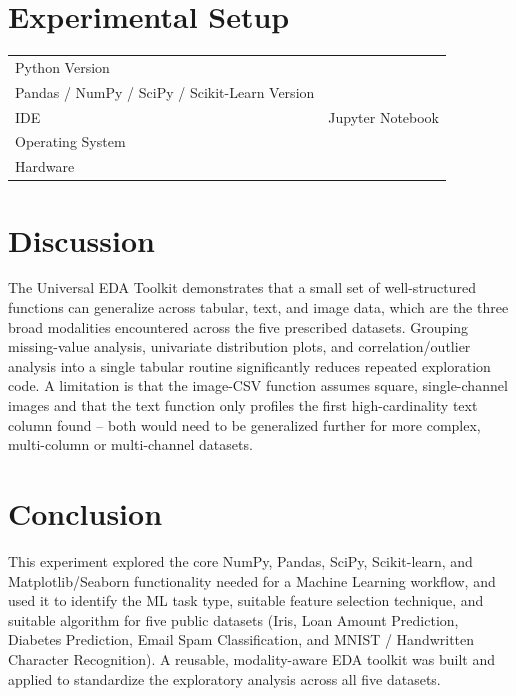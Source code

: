 \documentclass[12pt,a4paper]{article}
\begin{document}
\section{Experimental Setup}
\begin{tabular}{ll}
\toprule
Python Version & \\
Pandas / NumPy / SciPy / Scikit-Learn Version & \\
IDE & Jupyter Notebook \\
Operating System & \\
Hardware & \\
\bottomrule
\end{tabular}

\section{Discussion}
The Universal EDA Toolkit demonstrates that a small set of well-structured functions can
generalize across tabular, text, and image data, which are the three broad modalities
encountered across the five prescribed datasets. Grouping missing-value analysis, univariate
distribution plots, and correlation/outlier analysis into a single tabular routine
significantly reduces repeated exploration code. A limitation is that the image-CSV function
assumes square, single-channel images and that the text function only profiles the first
high-cardinality text column found -- both would need to be generalized further for more
complex, multi-column or multi-channel datasets.

\section{Conclusion}
This experiment explored the core NumPy, Pandas, SciPy, Scikit-learn, and Matplotlib/Seaborn
functionality needed for a Machine Learning workflow, and used it to identify the ML task
type, suitable feature selection technique, and suitable algorithm for five public datasets
(Iris, Loan Amount Prediction, Diabetes Prediction, Email Spam Classification, and MNIST /
Handwritten Character Recognition). A reusable, modality-aware EDA toolkit was built and
applied to standardize the exploratory analysis across all five datasets.
\end{document}
